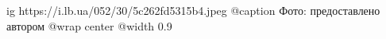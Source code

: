  
 
 
 
 

\ifcmt
  ig https://i.lb.ua/052/30/5c262fd5315b4.jpeg
	@caption Фото: предоставлено автором
  @wrap center
  @width 0.9
\fi
